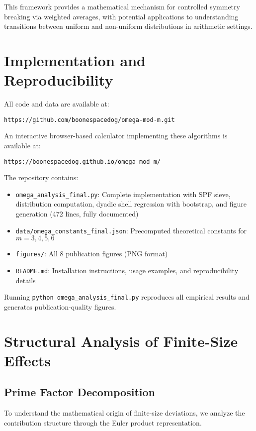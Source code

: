 \documentclass[12pt]{article}
\theoremstyle{definition}
\theoremstyle{remark}
\begin{document}
This framework provides a mathematical mechanism for controlled symmetry breaking via weighted averages, with potential applications to understanding transitions between uniform and non-uniform distributions in arithmetic settings.

\section{Implementation and Reproducibility}

All code and data are available at:
\begin{center}
\texttt{https://github.com/boonespacedog/omega-mod-m.git}
\end{center}

An interactive browser-based calculator implementing these algorithms is available at:
\begin{center}
\texttt{https://boonespacedog.github.io/omega-mod-m/}
\end{center}

The repository contains:
\begin{itemize}
\item \texttt{omega\_analysis\_final.py}: Complete implementation with SPF sieve, distribution computation, dyadic shell regression with bootstrap, and figure generation (472 lines, fully documented)
\item \texttt{data/omega\_constants\_final.json}: Precomputed theoretical constants for $m = 3, 4, 5, 6$
\item \texttt{figures/}: All 8 publication figures (PNG format)
\item \texttt{README.md}: Installation instructions, usage examples, and reproducibility details
\end{itemize}

Running \texttt{python omega\_analysis\_final.py} reproduces all empirical results and generates publication-quality figures.

\section{Structural Analysis of Finite-Size Effects}

\subsection{Prime Factor Decomposition}

To understand the mathematical origin of finite-size deviations, we analyze the contribution structure through the Euler product representation.
\end{document}
